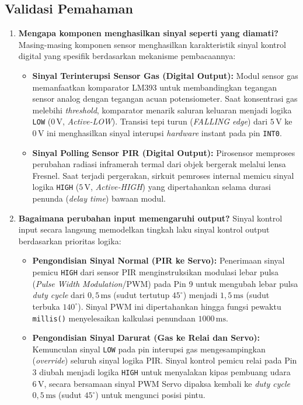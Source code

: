 \subsection{Validasi Pemahaman}
\begin{enumerate}
	\item \textbf{Mengapa komponen menghasilkan sinyal seperti yang diamati?}
	      Masing-masing komponen sensor menghasilkan karakteristik sinyal kontrol digital yang spesifik berdasarkan mekanisme pembacaannya:
	      \begin{itemize}
		      \item \textbf{Sinyal Terinterupsi Sensor Gas (Digital Output):} Modul sensor gas memanfaatkan komparator LM393 untuk membandingkan tegangan sensor analog dengan tegangan acuan potensiometer. Saat konsentrasi gas melebihi \textit{threshold}, komparator menarik saluran keluaran menjadi logika \texttt{LOW} ($0\,\text{V}$, \textit{Active-LOW}). Transisi tepi turun (\textit{FALLING edge}) dari $5\,\text{V}$ ke $0\,\text{V}$ ini menghasilkan sinyal interupsi \textit{hardware} instant pada pin \texttt{INT0}.
		      \item \textbf{Sinyal Polling Sensor PIR (Digital Output):} Pirosensor memproses perubahan radiasi inframerah termal dari objek bergerak melalui lensa Fresnel. Saat terjadi pergerakan, sirkuit pemroses internal memicu sinyal logika \texttt{HIGH} ($5\,\text{V}$, \textit{Active-HIGH}) yang dipertahankan selama durasi penunda (\textit{delay time}) bawaan modul.
	      \end{itemize}

	\item \textbf{Bagaimana perubahan input memengaruhi output?}
	      Sinyal kontrol input secara langsung memodelkan tingkah laku sinyal kontrol output berdasarkan prioritas logika:
	      \begin{itemize}
		      \item \textbf{Pengondisian Sinyal Normal (PIR ke Servo):} Penerimaan sinyal pemicu \texttt{HIGH} dari sensor PIR menginstruksikan modulasi lebar pulsa (\textit{Pulse Width Modulation}/PWM) pada Pin 9 untuk mengubah lebar pulsa \textit{duty cycle} dari $0{,}5\,\text{ms}$ (sudut tertutup $45^\circ$) menjadi $1{,}5\,\text{ms}$ (sudut terbuka $140^\circ$). Sinyal PWM ini dipertahankan hingga fungsi pewaktu \texttt{millis()} menyelesaikan kalkulasi penundaan $1000\,\text{ms}$.
		      \item \textbf{Pengondisian Sinyal Darurat (Gas ke Relai dan Servo):} Kemunculan sinyal \texttt{LOW} pada pin interupsi gas mengesampingkan (\textit{override}) seluruh sinyal logika PIR. Sinyal kontrol pemicu relai pada Pin 3 diubah menjadi logika \texttt{HIGH} untuk menyalakan kipas pembuang udara $6\,\text{V}$, secara bersamaan sinyal PWM Servo dipaksa kembali ke \textit{duty cycle} $0{,}5\,\text{ms}$ (sudut $45^\circ$) untuk mengunci posisi pintu.
	      \end{itemize}


\end{enumerate}
